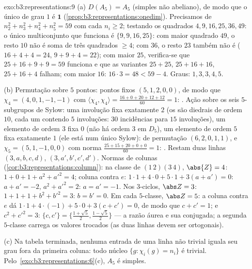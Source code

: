 \begin{solution}{exo:b3:representations:9}
(a) $D(A_5) = A_5$ (simples não abeliano), de modo que o único  de grau $1$
é $\mathbf 1$
(\cref{prop:b3:representations:onedim}). Precisamos de $n_2^2 + n_3^2
+ n_4^2 + n_5^2 = 59$ com cada $n_i \geq 2$; testando os
quadrados $4, 9, 16, 25, 36, 49$: o único multiconjunto que funciona é
$\{9, 9, 16, 25\}$: com maior quadrado $49$, o resto $10$
não é soma de três quadrados $\geq 4$; com $36$, o resto
$23$ também não é ($16 + 4 + 4 = 24$, $9 + 9 + 4 = 22$); com
maior $25$, verifica-se que $25 + 16 + 9 + 9 = 59$ funciona e que as variantes $25 +
25$, $25 + 16 + 16$, $25 + 16 + 4$ falham; com maior
$16$: $16\cdot3 = 48 < 59 - 4$. Graus: $1, 3, 3, 4, 5$.

(b) Permutação sobre $5$ pontos: pontos fixos $(5, 1, 2, 0, 0)$,
de modo que $\chi_4 = (4, 0, 1, -1, -1)$ com
$\langle\chi_4,\chi_4\rangle = \frac{16 + 0 + 20 + 12 + 12}{60}
= 1$: . Ação sobre os seis $5$-subgrupos de Sylow: uma
involução fixa exatamente $2$ (os  são diedrais de
ordem $10$, cada um contendo $5$ involuções: $30$ incidências
para $15$ involuções), um elemento de ordem $3$ fixa $0$ (não há ordem $3$ em
$D_5$), um elemento de ordem $5$ fixa exatamente $1$ (ele está num único
Sylow):  de permutação $(6, 2, 0, 1, 1)$, e $\chi_5 =
(5, 1, -1, 0, 0)$ com norma $\frac{25 + 15 + 20 + 0 + 0}{60} =
1$: . Restam duas linhas $(3, a, b, c, d)$, $(3, a', b', c',
d')$. Normas de colunas
(\cref{cor:b3:representations:column}): na classe de
$(1\,2)(3\,4)$, $\abs{Z} = 4$: $1 + 0 + 1 + a^2 + a'^2 = 4$;
coluna contra $e$: $1\cdot1 + 4\cdot 0 + 5\cdot1 + 3(a + a') =
0$: $a + a' = -2$, $a^2 + a'^2 = 2$: $a = a' = -1$. Nos
$3$-ciclos, $\abs Z = 3$: $1 + 1 + 1 + b^2 + b'^2 = 3$: $b = b'
= 0$. Em cada $5$-classe, $\abs Z = 5$: a coluna contra $e$
dá $1\cdot 1 + 4\cdot(-1) + 5\cdot 0 + 3(c + c') = 0$, de modo que
$c + c' = 1$; e
$c^2 + c'^2 = 3$: $\{c, c'\} = \bigl\{\frac{1+\sqrt5}2,
\frac{1-\sqrt5}2\bigr\}$ --- a razão áurea e sua
conjugada; a segunda $5$-classe carrega os valores trocados (as
duas linhas devem ser ortogonais).

(c) Na tabela terminada, nenhuma entrada de uma linha não trivial iguala
seu grau fora da primeira coluna: todo núcleo $\{g :
\chi_i(g) = n_i\}$ é trivial. Pelo~\cref{exo:b3:representations:6}(c), $A_5$ é simples.
\end{solution}

